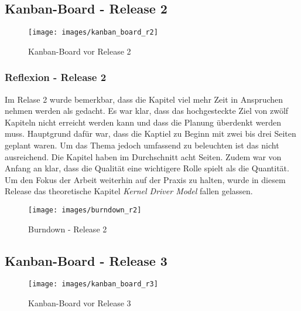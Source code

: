 \begin{landscape}

\subsection{Kanban-Board - Release 2}

\begin{figure}[h!]
	\begin{center}
		\texttt{[image: images/kanban\_board\_r2]}
	\end{center}
   \caption[Kanban-Board - Release 2]{Kanban-Board vor Release 2}
   \label{fig:kanban_r2}
\end{figure}

\end{landscape}
\restoregeometry

\subsubsection{Reflexion - Release 2}

Im Relase 2 wurde bemerkbar, dass die Kapitel viel mehr Zeit in Anspruchen nehmen werden als gedacht. Es war klar, dass das hochgesteckte Ziel von zwölf Kapiteln
nicht erreicht werden kann und dass die Planung überdenkt werden muss. Hauptgrund dafür war, dass die Kaptiel zu Beginn mit zwei bis drei Seiten geplant waren. Um das Thema
jedoch umfassend zu beleuchten ist das nicht ausreichend. Die Kapitel haben im Durchschnitt acht Seiten. Zudem war von Anfang an klar, dass die Qualität eine wichtigere Rolle spielt als
die Quantität. Um den Fokus der Arbeit weiterhin auf der Praxis zu halten, wurde in diesem Release das theoretische Kapitel \emph{Kernel Driver Model} fallen gelassen. \\

\begin{figure}[h!]
   \begin{center}
      \texttt{[image: images/burndown\_r2]}
   \end{center}
   \caption{Burndown - Release 2}
\end{figure}


\begin{landscape}


\subsection{Kanban-Board - Release 3}

\begin{figure}[h!]
	\begin{center}
		\texttt{[image: images/kanban\_board\_r3]}
	\end{center}
   \caption[Kanban-Board - Release 3]{Kanban-Board vor Release 3}
   \label{fig:kanban_r3}
\end{figure}

\end{landscape}
\restoregeometry

